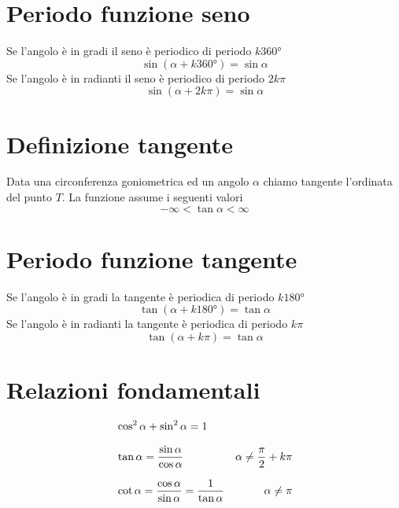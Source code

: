 \section{Periodo funzione seno}
Se l'angolo è in gradi il seno è periodico di periodo $k\ang{360}$
\begin{equation}
\sin(\alpha+k\ang{360;;})=\sin\alpha
\end{equation}
Se l'angolo è in radianti il seno è periodico di periodo $2k\pi$
\begin{equation}
\sin(\alpha+2k\pi)=\sin\alpha
\end{equation}
\section{Definizione tangente}
Data una circonferenza goniometrica ed un angolo $\alpha$ chiamo tangente l'ordinata del punto $T$.
La funzione assume i seguenti valori
\begin{equation}
-\infty<\tan\alpha< \infty
\end{equation}
\begin{center}
	
\end{center}
\section{Periodo funzione tangente}
Se l'angolo è in gradi la tangente è periodica di periodo $k\ang{180}$
\begin{equation}
\tan(\alpha+k\ang{180;;})=\tan\alpha
\end{equation}
Se l'angolo è in radianti la tangente è periodica di periodo $k\pi$
\begin{equation}
\tan(\alpha+k\pi)=\tan\alpha
\end{equation}
\section{Relazioni fondamentali}
\begin{align}	
	&\cos^{2}\alpha+\sin^{2}\alpha=1\\[.25cm]\index{Goniometria!relazione!fondamentale}
	&\tan\alpha={}\dfrac{\sin\alpha}{\cos\alpha}&\alpha\neq\dfrac{\pi}{2}+k\pi\\[.25cm]\index{Tangente!definizione}
	&\cot\alpha={}\dfrac{\cos\alpha}{\sin\alpha}={}\dfrac{1}{\tan\alpha}&\alpha\neq\pi\index{Cotangente!definizione}
\end{align}
